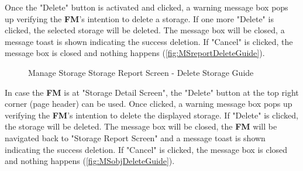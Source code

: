 Once the "Delete" button is activated and clicked, a warning message box pops up verifying the \textbf{FM}'s intention to delete a storage. If one more "Delete" is clicked, the selected storage will be deleted. The message box will be closed, a message toast is shown indicating the success deletion. If "Cancel" is clicked, the message box is closed and nothing happens (\autoref{fig:MSreportDeleteGuide}).

\begin{figure}[H]
	\centering
  
    \vspace{10pt}
    
  
    \vspace{10pt}
    

    \caption{Manage Storage Storage Report Screen - Delete Storage Guide}
	\label{fig:MSreportDeleteGuide}
\end{figure}


In case the \textbf{FM} is at "Storage Detail Screen", the "Delete" button at the top right corner (page header) can be used. 
Once clicked, a warning message box pops up verifying the \textbf{FM}'s intention to delete the displayed storage. If "Delete" is clicked, the storage will be deleted. The message box will be closed, the \textbf{FM} will be navigated back to "Storage Report Screen" and a message toast is shown indicating the success deletion. If "Cancel" is clicked, the message box is closed and nothing happens (\autoref{fig:MSobjDeleteGuide}).

